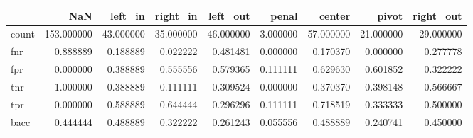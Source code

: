 \begin{tabular}{lrrrrrrrr}
\toprule
{} &         NaN &    left\_in &   right\_in &   left\_out &     penal &     center &      pivot &  right\_out \\
\midrule
count &  153.000000 &  43.000000 &  35.000000 &  46.000000 &  3.000000 &  57.000000 &  21.000000 &  29.000000 \\
fnr   &    0.888889 &   0.188889 &   0.022222 &   0.481481 &  0.000000 &   0.170370 &   0.000000 &   0.277778 \\
fpr   &    0.000000 &   0.388889 &   0.555556 &   0.579365 &  0.111111 &   0.629630 &   0.601852 &   0.322222 \\
tnr   &    1.000000 &   0.388889 &   0.111111 &   0.309524 &  0.000000 &   0.370370 &   0.398148 &   0.566667 \\
tpr   &    0.000000 &   0.588889 &   0.644444 &   0.296296 &  0.111111 &   0.718519 &   0.333333 &   0.500000 \\
bacc  &    0.444444 &   0.488889 &   0.322222 &   0.261243 &  0.055556 &   0.488889 &   0.240741 &   0.450000 \\
\bottomrule
\end{tabular}
